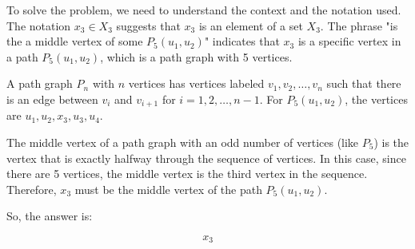 To solve the problem, we need to understand the context and the notation used. The notation \(x_3 \in X_3\) suggests that \(x_3\) is an element of a set \(X_3\). The phrase "is the a middle vertex of some \(P_5(u_1, u_2)\)" indicates that \(x_3\) is a specific vertex in a path \(P_5(u_1, u_2)\), which is a path graph with 5 vertices.

A path graph \(P_n\) with \(n\) vertices has vertices labeled \(v_1, v_2, \ldots, v_n\) such that there is an edge between \(v_i\) and \(v_{i+1}\) for \(i = 1, 2, \ldots, n-1\). For \(P_5(u_1, u_2)\), the vertices are \(u_1, u_2, x_3, u_3, u_4\).

The middle vertex of a path graph with an odd number of vertices (like \(P_5\)) is the vertex that is exactly halfway through the sequence of vertices. In this case, since there are 5 vertices, the middle vertex is the third vertex in the sequence. Therefore, \(x_3\) must be the middle vertex of the path \(P_5(u_1, u_2)\).

So, the answer is:

\[
\boxed{x_3}
\]